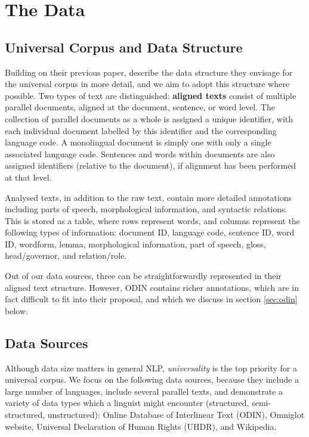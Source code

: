 \section{The Data}\label{sec:data}



\subsection{Universal Corpus and Data Structure} \label{sec:structure}

Building on their previous paper,  describe the data structure they envisage for the universal corpus in more detail, and we aim to adopt this structure where possible.  Two types of text are distinguished: \textbf{aligned texts} consist of multiple parallel documents, aligned at the document, sentence, or word level. The collection of parallel documents as a whole is assigned a unique identifier, with each individual document labelled by this identifier and the corresponding language code.  A monolingual document is simply one with only a single associated language code.  Sentences and words within documents are also assigned identifiers (relative to the document), if alignment has been performed at that level.

Analysed texts, in addition to the raw text, contain more detailed annotations including parts of speech, morphological information, and syntactic relations.  This is stored as a table, where rows represent words, and columns represent the following types of information: document ID, language code, sentence ID, word ID, wordform, lemma, morphological information, part of speech, gloss, head/governor, and relation/role.

Out of our data sources, three can be straightforwardly represented in their aligned text structure. However, ODIN contains richer annotations, which are in fact difficult to fit into their proposal, and which we discuss in section \ref{sec:odin} below.


\subsection{Data Sources} \label{sec:sources}

Although data size matters in general NLP, \emph{universality} is the top priority for a universal corpus. We focus on the following data sources, because they include a large number of languages, include several parallel texts, and demonstrate a variety of data types which a linguist might encounter (structured, semi-structured, unstructured): Online Database of Interlinear Text (ODIN), Omniglot website, Universal Declaration of Human Rights (UHDR), and Wikipedia.

